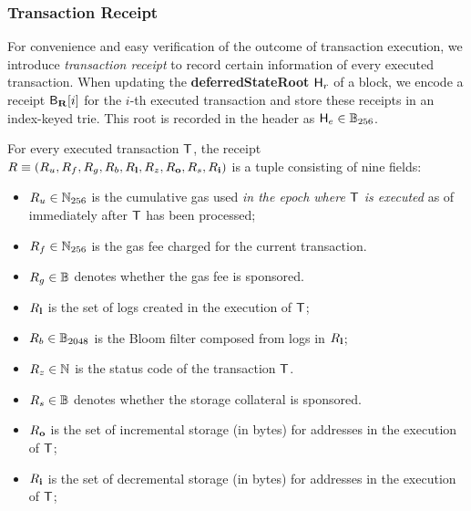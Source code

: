 
\subsubsection{Transaction Receipt}

For convenience and easy verification of the outcome of transaction execution, 
we introduce \emph{transaction receipt} to record certain information of every executed transaction.
When updating the {\bf deferredStateRoot} $\textsf{H}_r$ of a block,
we encode a receipt $\textsf{B}_{\mathbf{R}}[i]$ for the $i$-th executed transaction
and store these receipts in an index-keyed trie.
This root is recorded in the header as $\textsf{H}_e\in\mathbb{B}_{256}$.


For every executed transaction $\textsf{T}$, the receipt $R\equiv \left(R_u, R_f, R_g, R_b, R_{\bf l}, R_z,R_{\bf o},R_s,R_{\bf i}\right)$ is a tuple consisting of nine fields:
\begin{itemize}[nosep]
	\item $R_u\in\mathbb{N}_{256}$ is the cumulative gas used \emph{in the epoch where $\textsf{T}$ is executed} as of immediately after $\textsf{T}$ has been processed;
	
	\item $R_f\in\mathbb{N}_{256}$ is the gas fee charged for the current transaction. 
	
	\item $R_g \in \mathbb{B}$ denotes whether the gas fee is sponsored. 

	\item $R_{\bf l}$ is the set of logs created in the execution of $\textsf{T}$;

	\item $R_b\in\mathbb{B}_{2048}$ is the Bloom filter composed from logs in $R_{\bf l}$;

	\item $R_z\in\mathbb{N}$ is the status code of the transaction $\textsf{T}$.
	
	\item $R_s \in \mathbb{B}$ denotes whether the storage collateral is sponsored. 
	
	\item $R_{\bf o}$ is the set of incremental storage (in bytes) for addresses in the execution of $\textsf{T}$;

	\item $R_{\bf i}$ is the set of decremental storage (in bytes) for addresses in the execution of $\textsf{T}$;
\end{itemize}

